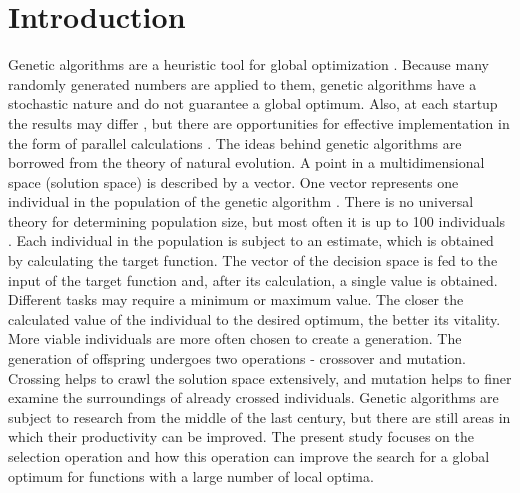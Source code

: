 \documentclass[graybox]{styles/svmult}
\begin{document}

\section{Introduction}
\label{sec:1}

Genetic algorithms are a heuristic tool for global optimization \cite{balabanov-01}. Because many randomly generated numbers are applied to them, genetic algorithms have a stochastic nature and do not guarantee a global optimum. Also, at each startup the results may differ \cite{balabanov-02}, but there are opportunities for effective implementation in the form of parallel calculations \cite{balabanov-03}. The ideas behind genetic algorithms are borrowed from the theory of natural evolution. A point in a multidimensional space (solution space) is described by a vector. One vector represents one individual in the population of the genetic algorithm \cite{balabanov-04}. There is no universal theory for determining population size, but most often it is up to 100 individuals \cite{alander-01}. Each individual in the population is subject to an estimate, which is obtained by calculating the target function. The vector of the decision space is fed to the input of the target function and, after its calculation, a single value is obtained. Different tasks may require a minimum or maximum value. The closer the calculated value of the individual to the desired optimum, the better its vitality. More viable individuals are more often chosen to create a generation. The generation of offspring undergoes two operations - crossover and mutation. Crossing helps to crawl the solution space extensively, and mutation helps to finer examine the surroundings of already crossed individuals. Genetic algorithms are subject to research from the middle of the last century, but there are still areas in which their productivity can be improved. The present study focuses on the selection operation and how this operation can improve the search for a global optimum for functions with a large number of local optima.
\end{document}
